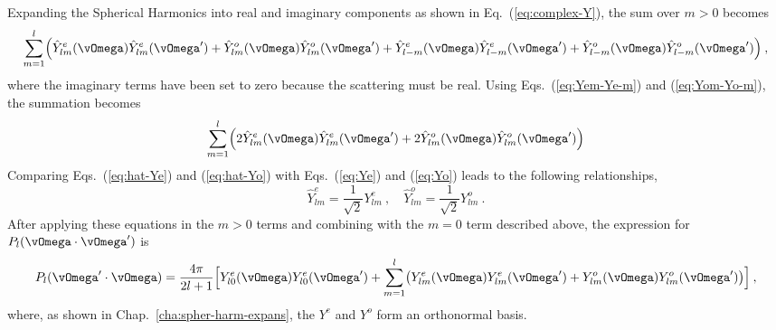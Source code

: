 \documentclass{article}
\numberwithin{equation}{subsection}
\begin{document}
Expanding the Spherical Harmonics into real and imaginary components as shown
in Eq.~(\ref{eq:complex-Y}), the sum over $m>0$ becomes
\begin{equation}
  \sum_{m=1}^l\Bigl(
  \hat{Y}^e_{lm}(\vOmega)\hat{Y}^e_{lm}(\vOmega') +
  \hat{Y}^o_{lm}(\vOmega)\hat{Y}^o_{lm}(\vOmega') +
  \hat{Y}^e_{l-m}(\vOmega)\hat{Y}^e_{l-m}(\vOmega') +
  \hat{Y}^o_{l-m}(\vOmega)\hat{Y}^o_{l-m}(\vOmega')\Bigr)\:,
\end{equation}
where the imaginary terms have been set to zero because the scattering must be
real.  Using Eqs.~(\ref{eq:Yem-Ye-m}) and (\ref{eq:Yom-Yo-m}), the summation
becomes
\begin{equation}
  \sum_{m=1}^l\Bigl(
  2\hat{Y}^e_{lm}(\vOmega)\hat{Y}^e_{lm}(\vOmega') +
  2\hat{Y}^o_{lm}(\vOmega)\hat{Y}^o_{lm}(\vOmega')\Bigr)
\end{equation}
Comparing Eqs.~(\ref{eq:hat-Ye}) and (\ref{eq:hat-Yo}) with Eqs.~(\ref{eq:Ye})
and (\ref{eq:Yo}) leads to the following relationships,
\begin{equation}
  \hat{Y}^e_{lm} = \frac{1}{\sqrt{2}}Y^e_{lm}\:,\quad
  \hat{Y}^o_{lm} = \frac{1}{\sqrt{2}}Y^o_{lm}\:.
\end{equation}
After applying these equations in the $m>0$ terms and combining with the $m=0$
term described above, the expression for $P_l(\vOmega\cdot\vOmega')$ is
\begin{equation}
  P_l(\vOmega'\cdot\vOmega) = \frac{4\pi}{2l+1}
  \Bigl[
  Y^e_{l0}(\vOmega)Y^e_{l0}(\vOmega') +
  \sum_{m=1}^l
  \bigl(Y^e_{lm}(\vOmega)Y^e_{lm}(\vOmega') +
  Y^o_{lm}(\vOmega)Y^o_{lm}(\vOmega')\bigr)\Bigr]\:,
  \label{eq:P_l(mu_o)}
\end{equation}
where, as shown in Chap.~\ref{cha:spher-harm-expans}, the $Y^e$ and $Y^o$ form
an orthonormal basis.
\end{document}
